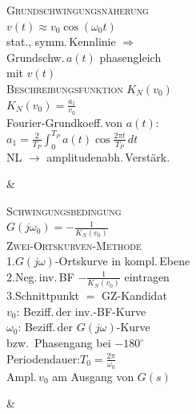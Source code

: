 \begin{formelreihe}
  \parbox[t]{\linewidth}{%
    {\scriptsize\scshape\color{gray!65!black} Grundschwingungsnäherung}\\[0.03em]%
    \scriptsize
    $v(t)\!\approx\!v_0\cos(\omega_0 t)$\\[0.03em]
    stat., symm.\,Kennlinie $\Rightarrow$\\
    Grundschw.\,$a(t)$ phasengleich\\
    mit $v(t)$\\[0.06em]
    {\scriptsize\scshape\color{gray!65!black} Beschreibungsfunktion $K_N(v_0)$}\\[0.03em]%
    $\displaystyle K_N(v_0)=\frac{a_1}{v_0}$\\[0.04em]
    {\scriptsize Fourier-Grundkoeff.\,von $a(t)$:}\\[0.02em]
    $\displaystyle a_1=\tfrac{2}{T_P}\!\int_0^{T_P}\!a(t)\cos\tfrac{2\pi t}{T_P}\,dt$\\[0.03em]
    \scriptsize NL $\to$ amplitudenabh.\,Verstärk.} &
  \parbox[t]{\linewidth}{%
    {\scriptsize\scshape\color{cKap7!80!black} Schwingungsbedingung}\\[0.03em]%
    $\displaystyle G(j\omega_0)=-\frac{1}{K_N(v_0)}$\\[0.06em]
    {\scriptsize\scshape\color{gray!65!black} Zwei-Ortskurven-Methode}\\[0.03em]%
    \scriptsize
    1.\;$G(j\omega)$-Ortskurve in kompl.\,Ebene\\[0.02em]
    2.\;Neg.\,inv.\,BF $-\tfrac{1}{K_N(v_0)}$ eintragen\\[0.02em]
    3.\;Schnittpunkt $=$ GZ-Kandidat\\[0.02em]
    \quad $v_0$: Beziff.\,der inv.-BF-Kurve\\[0.01em]
    \quad $\omega_0$: Beziff.\,der $G(j\omega)$-Kurve\\[0.01em]
    \quad\;\;bzw.\ Phasengang bei $-180^\circ$\\[0.04em]
    Periodendauer:\;$T_0=\tfrac{2\pi}{\omega_0}$\\[0.04em]
    Ampl.\,$v_0$ am Ausgang von $G(s)$} &
   \\[0.3em]
\end{formelreihe}
\bereichende

